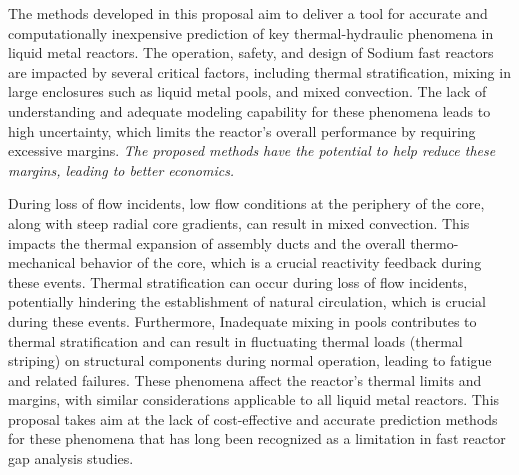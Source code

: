 


The methods developed in this proposal aim to deliver a tool for accurate and
computationally inexpensive prediction of key thermal-hydraulic phenomena in
liquid metal reactors. The operation, safety, and design of Sodium fast
reactors are impacted by several critical factors, including thermal
stratification, mixing in large enclosures such as liquid metal pools, and
mixed convection. The lack of understanding and adequate modeling capability
for these phenomena leads to high uncertainty, which limits the reactor's
overall performance by requiring excessive margins. 
\textit{ The proposed methods have the potential to help 
reduce these margins, leading to better economics.}

During loss of flow incidents, low flow conditions at the periphery of the
core, along with steep radial core gradients, can result in mixed convection.
This impacts the thermal expansion of assembly ducts and the overall
thermo-mechanical behavior of the core, which is a crucial reactivity feedback
during these events.  Thermal stratification can occur during loss of flow
incidents, potentially hindering the establishment of natural circulation,
which is crucial during these events. Furthermore, Inadequate mixing in pools
contributes to thermal stratification and can result in fluctuating thermal
loads (thermal striping) on structural components during normal operation,
leading to fatigue and related failures.
 These phenomena affect the reactor's thermal limits and margins, with similar
considerations applicable to all liquid metal reactors.  This proposal takes
aim at the lack of cost-effective and accurate prediction methods for these
phenomena that has long been recognized as a limitation in fast reactor gap analysis
studies.




